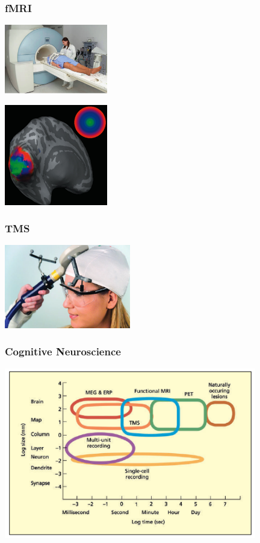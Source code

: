 \documentclass[]{beamer}
\begin{document}
\begin{frame}
 \frametitle{fMRI}
\begin{center}
\includegraphics[width=45mm]{figs/l1/fmri_magnet.png} 

\vspace{3mm}
\includegraphics[width=45mm]{figs/l1/fmri_flat_map.png} 
\end{center}
\end{frame}

\begin{frame}
 \frametitle{TMS}
\begin{center}
\includegraphics[width=55mm]{figs/l1/tms.png} 
\end{center}
\end{frame}


\begin{frame}
\frametitle{Cognitive Neuroscience}
\includegraphics[width=110mm]{figs/methods_classification.png}
\end{frame}
\end{document}
